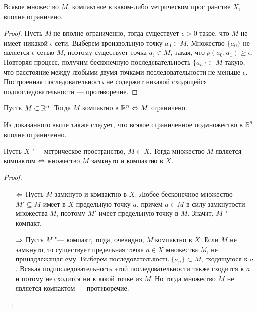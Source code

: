 \begin{theorem}
    Всякое множество $M$, компактное в каком-либо метрическом пространстве $X$, вполне ограничено.
\end{theorem}

\begin{proof}
    Пусть $M$ не вполне ограниченно, тогда существует $\epsilon > 0$ такое, что $M$ не имеет никакой $\epsilon$-сети. Выберем произвольную точку $a_0 \in M$. Множество $\lbrace a_0\rbrace$ не является $\epsilon$-сетью $M$, поэтому существует точка $a_1\in M$, такая, что $\rho(a_0, a_1)\geq \epsilon$. Повторяя процесс, получим бесконечную последовательность $\{a_n\} \subset M$ такую, что расстояние между любыми двумя точками последовательности не меньше $\epsilon$. Построенная последовательность не содержит никакой сходящейся подпоследовательности --- противоречие.
\end{proof}

\begin{corollary}
    Пусть $M \subset \mathbb{R}^n$. Тогда $M$ компактно в $\mathbb R^n \Leftrightarrow M$ ограничено.
\end{corollary}

\begin{note}
    Из доказанного выше также следует, что всякое ограниченное подмножество в $\mathbb R^n$ вполне ограниченно.
\end{note}

\begin{theorem}
    Пусть $X$ "--- метрическое пространство, $M \subset X$. Тогда множество $M$ является компактом $\Leftrightarrow$ множество $M$ замкнуто и компактно в $X$.
\end{theorem}

\begin{proof}~
    \begin{itemize}
        \item[$\Leftarrow$] Пусть $M$ замкнуто и компактно в $X$. Любое бесконечное множество $M' \subseteq M$ имеет в $X$ предельную точку $a$, причем $a\in M$ в силу замкнутости множества $M$, поэтому $M'$ имеет предельную точку в $M$. Значит, $M$ "--- компакт.
        
        \item[$\Rightarrow$] Пусть $M$ "--- компакт, тогда, очевидно, $M$ компактно в $X$. Если $M$ не замкнуто, то существует предельная точка $a \in X$ множества $M$, не принадлежащая ему. Выберем последовательность $\lbrace a_n\rbrace \subset M$, сходящуюся к $a$. Всякая подпоследовательность этой последовательности также сходится к $a$ и потому не сходится ни к какой точке из $M$. Но тогда множество $M$ не является компактом --- противоречие.\qedhere
    \end{itemize}
\end{proof}

